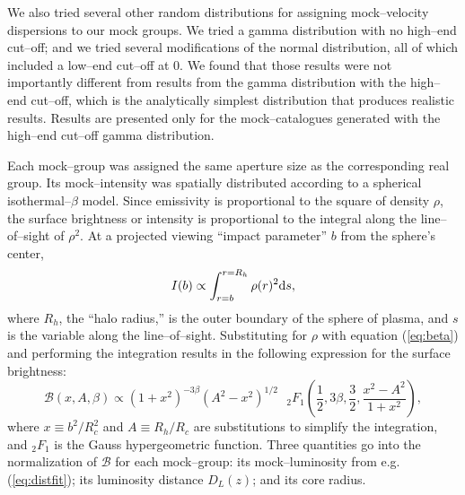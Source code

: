 \documentclass[12pt,preprint]{aastex}
\newcommand{\spa}{\mbox{ }}
\begin{document}
We also tried several other random distributions for assigning mock--velocity
dispersions to our mock groups.  We tried a gamma distribution with no high--end
cut--off; and we tried several modifications of the normal distribution,
all of which included a low--end cut--off at $0$.  We found that those results
were not importantly different from results from the gamma distribution
with the high--end cut--off, which is the analytically simplest distribution
that produces realistic results.  Results are presented only for the
mock--catalogues generated with the high--end cut--off gamma distribution.

Each mock--group was assigned the same aperture size as the corresponding
real group.  Its mock--intensity was spatially distributed according to a
spherical isothermal--$\beta$ model.  Since emissivity is proportional to
the square of density $\rho$, the surface brightness or intensity is
proportional to the integral along the line--of--sight of $\rho^2$.  At a 
projected viewing ``impact parameter'' $b$ from the sphere's center,
\[
I(b) \propto \int_{r=b}^{r=R_h} \rho(r)^2 {\rm d} s,
\]
where $R_h$, the ``halo radius,'' is the outer boundary of the sphere of
plasma, and $s$ is the variable along the line--of--sight.  Substituting for
$\rho$ with equation (\ref{eq:beta}) and performing the integration results in
the following expression for the surface brightness:
\begin{equation}
\mathcal{B}(x,A,\beta) \propto (1+x^2)^{-3\beta} (A^2 - x^2)^{1/2} \spa { _2F_1}\left(\frac{1}{2},3\beta,\frac{3}{2},\frac{x^2-A^2}{1+x^2} \right),
\label{eq:bright}
\end{equation}
where $x \equiv b^2/R_c^2$ and $A \equiv R_h/R_c$ are substitutions to simplify
the integration, and $_2F_1$ is the Gauss hypergeometric function.  Three
quantities go into the normalization of $\mathcal{B}$ for each mock--group:
its mock--luminosity from e.g. (\ref{eq:distfit}); its luminosity distance
$D_L(z)$; and its core radius.
\end{document}
